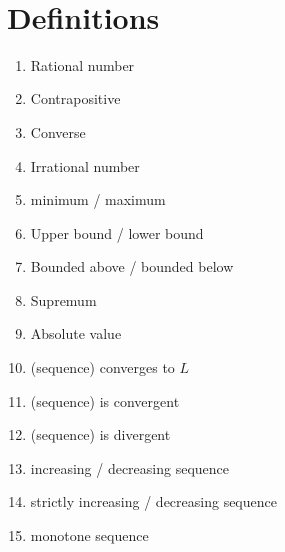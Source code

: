\documentclass[12pt]{amsart}
\begin{document}

\

\section*{Definitions}

\begin{enumerate}
	\item Rational number
	\item Contrapositive
	\item Converse
	\item Irrational number
	\item minimum / maximum
	\item Upper bound / lower bound
	\item Bounded above / bounded below
	\item Supremum%
			\item Absolute value
	\item (sequence) converges to $L$


	\item (sequence) is convergent
	
	\item (sequence) is divergent

	\item increasing / decreasing sequence
	\item strictly increasing / decreasing sequence
	\item monotone sequence
		\begin{comment}
	\item diverges to $+\infty$ or $-\infty$		
					
	\item Subsequence
	



	\item Limit of a function

	\item Continuous at a point
	\item Continuous on an open interval

	\item Continuous on a closed interval
	
	\item Differentiable
	\item Derivative (at a point)
	\item Derivative (function)
		\item Increasing/decreasing function

\end{comment}
\end{enumerate}
\end{document}

